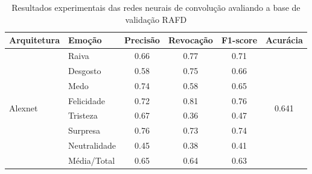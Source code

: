 \begin{table}[]
\centering
\caption{Resultados experimentais das redes neurais de convolução avaliando a base de validação RAFD}
\label{table:rafd}
\begin{tabular}{llcccc}
\hline
\textbf{Arquitetura}                   & \textbf{Emoção}       & \multicolumn{1}{l}{\textbf{Precisão}} & \multicolumn{1}{l}{\textbf{Revocação}} & \multicolumn{1}{l}{\textbf{F1-score}} & \multicolumn{1}{l}{\textbf{Acurácia}} \\ \hline
\multirow{8}{*}{Alexnet}         & Raiva                 & 0.66                                  & 0.77                                   & 0.71                                  & \multirow{8}{*}{0.641}                \\
                                       & Desgosto              & 0.58                                  & 0.75                                   & 0.66                                  &                                       \\
                                       & Medo                  & 0.74                                  & 0.58                                   & 0.65                                  &                                       \\
                                       & Felicidade            & 0.72                                  & 0.81                                   & 0.76                                  &                                       \\
                                       & Tristeza              & 0.67                                  & 0.36                                   & 0.47                                  &                                       \\
                                       & Surpresa              & 0.76                                  & 0.73                                   & 0.74                                  &                                       \\
                                       & Neutralidade          & 0.45                                  & 0.38                                   & 0.41                                  &                                       \\
                                       & Média/Total           & 0.65                                  & 0.64                                   & 0.63                                  &                                       \\ \hline

\end{tabular}
\end{table}
